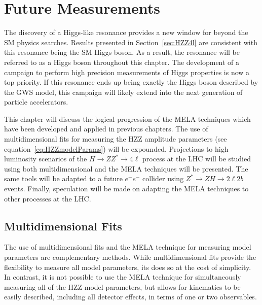 

\chapter{Future Measurements}
\label{sec:FutureMeasurements}

The discovery of a Higgs-like resonance provides a new window
for beyond the SM physics searches.  Results presented in 
Section~\ref{sec:HZZ4l} are consistent with this resonance 
being the SM Higgs boson.  As a result, the resonance will be
referred to as a Higgs boson throughout this chapter. 
The development of a campaign to perform high precision
measurements of Higgs properties is now a top priority.
If this resonance ends up 
being exactly the Higgs boson described by the GWS model, 
this campaign will likely extend into the next generation of 
particle accelerators.  

This chapter will discuss the logical progression of the MELA
techniques which have been developed and applied in previous 
chapters.  The use of multidimensional fits for measuring the 
HZZ amplitude parameters (see
equation~\ref{eq:HZZmodelParams}) will be expounded.  
Projections to high luminosity scenarios of the $H\to ZZ^*\to4\ell$
process at the LHC will be studied using both multidimensional
and the MELA techniques will be presented.  The same tools will
be adapted to a future $e^+e^-$ collider using $Z^*\to ZH\to 2\ell2b$
events.   Finally, speculation will be made on adapting the MELA
techniques to other processes at the LHC.

\section{Multidimensional Fits}

The use of multidimensional fits 
and the MELA technique for measuring model parameters are 
complementary methods.  While multidimensional fits provide 
the flexibility to measure all model parameters, its does so at
the cost of simplicity. In contrast, it is not possible to use
the MELA 
technique for simultaneously measuring all of the HZZ model 
parameters, but allows for 
kinematics to be easily described, including all detector effects,
in terms of one or two observables. 

